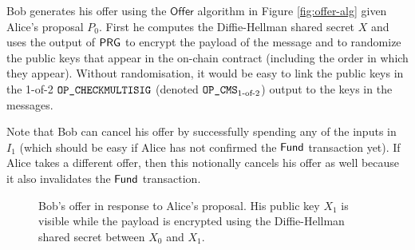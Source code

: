 \documentclass[runningheads]{llncs}
\begin{document}
Bob generates his offer using the $\textsf{Offer}$ algorithm in Figure \ref{fig:offer-alg} given Alice's proposal $P_0$. First he computes the Diffie-Hellman shared secret $X$ and uses the output of $\textsf{PRG}$ to encrypt the payload of the message and to randomize the public keys that appear in the on-chain contract (including the order in which they appear). Without randomisation, it would be easy to link the public keys in the 1-of-2 $\texttt{OP\_CHECKMULTISIG}$\cite{opcheckmultisig} (denoted $\texttt{OP\_CMS}_{\text{1-of-2}}$) output to the keys in the messages.

Note that Bob can cancel his offer by successfully spending any of the inputs in $I_1$ (which should be easy if Alice has not confirmed the $\textsf{Fund}$ transaction yet). If Alice takes a different offer, then this notionally cancels his offer as well because it also invalidates the $\textsf{Fund}$ transaction.

\begin{figure}[!h]
\centering
\caption{Bob's offer in response to Alice's proposal. His public key $X_1$ is visible while the payload is encrypted using the Diffie-Hellman shared secret between $X_0$ and $X_1$.}\label{fig:bob-offer}
\end{figure}
\end{document}
